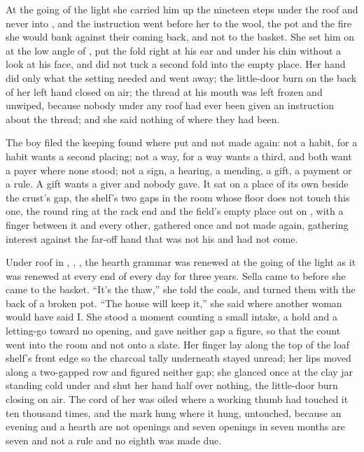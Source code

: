 \scenebreak

At the going of the light she carried him up the nineteen steps under the roof and never into , and the instruction went before her to the wool, the pot and the fire she would bank against their coming back, and not to the basket. She set him on  at the low angle of , put the fold right at his ear and under his chin without a look at his face, and did not tuck a second fold into the empty place. Her hand did only what the setting needed and went away; the little-door burn on the back of her left hand closed on air; the thread at his mouth was left frozen and unwiped, because nobody under any roof had ever been given an instruction about the thread; and she said nothing of where they had been.

The boy filed the keeping found where put and not made again: not a habit, for a habit wants a second placing; not a way, for a way wants a third, and both want a payer where none stood; not a sign, a hearing, a mending, a gift, a payment or a rule. A gift wants a giver and nobody gave. It sat on a place of its own beside the crust's gap, the shelf's two gaps in the room whose floor does not touch this one, the round ring at the rack end and the field's empty place out on , with a finger between it and every other, gathered once and not made again, gathering interest against the far-off hand that was not his and had not come.

Under  roof in , , , the hearth grammar was renewed at the going of the light as it was renewed at every end of every day for three years. Sella came to  before she came to the basket. “It's the thaw,” she told the coals, and turned them with the back of a broken pot. “The house will keep it,” she said where another woman would have said I. She stood a moment counting a small intake, a hold and a letting-go toward no opening, and gave neither gap a figure, so that the count went into the room and not onto a slate. Her finger lay along the top of the loaf shelf's front edge so the charcoal tally underneath stayed unread; her lips moved along a two-gapped row and figured neither gap; she glanced once at the clay jar standing cold under  and shut her hand half over nothing, the little-door burn closing on air. The cord of her  was oiled where a working thumb had touched it ten thousand times, and the mark hung where it hung, untouched, because an evening and a hearth are not openings and seven openings in seven months are seven and not a rule and no eighth was made due.

